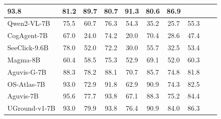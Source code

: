 \begin{table}[!t]
{\begin{tabular}{lccccccccl}
\cellcolor{lightblue}93.8 & \cellcolor{lightblue}81.2 & \cellcolor{lightblue}89.7 & \cellcolor{lightblue}80.7 & \cellcolor{lightblue}91.3 & \cellcolor{lightblue}80.6 & \cellcolor{lightblue}\textbf{86.9} \\
\midrule
Qwen2-VL-7B & 75.5 & 60.7 & 76.3 & 54.3 & 35.2 & 25.7 & \cellcolor{lightblue}55.3 \\
CogAgent-7B & 67.0 & 24.0 & 74.2 & 20.0 & 70.4 & 28.6 & \cellcolor{lightblue}47.4 \\
SeeClick-9.6B & 78.0 & 52.0 & 72.2 & 30.0 & 55.7 & 32.5 & \cellcolor{lightblue}53.4 \\
Magma-8B & 60.4 & 58.5 & 75.3 & 52.9 & 69.1 & 52.0 & \cellcolor{lightblue}60.3\\
Aguvis-G-7B & 88.3 & 78.2 & 88.1 & 70.7 & 85.7 & 74.8 & \cellcolor{lightblue}81.8 \\
OS-Atlas-7B & 93.0 & 72.9 & 91.8 & 62.9 & 90.9 & 74.3 & \cellcolor{lightblue}82.5 \\
Aguvis-7B & 95.6 & 77.7 & 93.8 & 67.1 & 88.3 & 75.2 & \cellcolor{lightblue}84.4 \\
UGround-v1-7B & 93.0 & 79.9 & 93.8 & 76.4 & 90.9 & 84.0 & \cellcolor{lightblue}86.3 \\


\end{tabular}}
\end{table}
